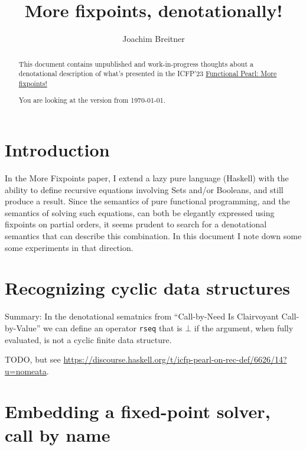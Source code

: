 \documentclass[manuscript,screen,acmsmall,nonacm]{acmart}
\begin{document}
\title{More fixpoints, denotationally!}

\author{Joachim Breitner}


\begin{abstract}
This document contains unpublished and work-in-progress thoughts about a denotational description of what's presented in the ICFP'23
\href{https://joachim-breitner.de/publications/rec-def-pearl.pdf}{Functional Pearl: More fixpoints!}

\medskip\noindent
You are looking at the version from \today.
\end{abstract}

\maketitle

\section{Introduction}

In the More Fixpoints paper, I extend a lazy pure language (Haskell) with the ability to define recursive equations involving Sets and/or Booleans, and still produce a result. Since the semantics of pure functional programming, and the semantics of solving such equations, can both be elegantly expressed using fixpoints on partial orders, it seems prudent to search for a denotational semantics that can describe this combination. In this document I note down some some experiments in that direction.


\section{Recognizing cyclic data structures}

Summary: In the denotational sematnics from “Call-by-Need Is Clairvoyant Call-by-Value” we can define an operator \texttt{rseq} that is $\bot$ if the argument, when fully evaluated, is not a cyclic finite data structure.

TODO, but see \url{https://discourse.haskell.org/t/icfp-pearl-on-rec-def/6626/14?u=nomeata}.

\section{Embedding a fixed-point solver, call by name}
\end{document}
